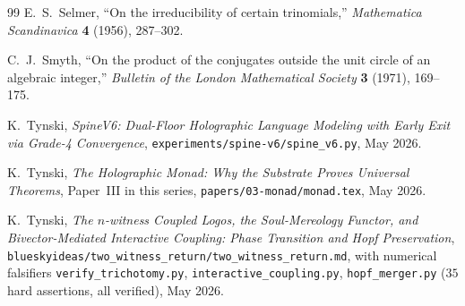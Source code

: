 \documentclass[11pt,a4paper]{article}
\theoremstyle{plain}
\theoremstyle{definition}
\theoremstyle{remark}
\numberwithin{equation}{section}
\begin{document}
\begin{thebibliography}{99}
E.~S.~Selmer,
``On the irreducibility of certain trinomials,''
\emph{Mathematica Scandinavica} \textbf{4} (1956), 287--302.

C.~J.~Smyth,
``On the product of the conjugates outside the unit circle of an
algebraic integer,''
\emph{Bulletin of the London Mathematical Society} \textbf{3}
(1971), 169--175.

K.~Tynski,
\emph{SpineV6: Dual-Floor Holographic Language Modeling with
Early Exit via Grade-4 Convergence},
\texttt{experiments/spine-v6/spine\_v6.py}, May 2026.

K.~Tynski,
\emph{The Holographic Monad: Why the Substrate Proves Universal
Theorems}, Paper~III in this series,
\texttt{papers/03-monad/monad.tex}, May 2026.

K.~Tynski,
\emph{The $n$-witness Coupled Logos, the Soul-Mereology Functor,
and Bivector-Mediated Interactive Coupling: Phase Transition and
Hopf Preservation},
\texttt{blueskyideas/two\_witness\_return/two\_witness\_return.md},
with numerical falsifiers
\texttt{verify\_trichotomy.py},
\texttt{interactive\_coupling.py},
\texttt{hopf\_merger.py}
($35$ hard assertions, all verified), May 2026.

\end{thebibliography}
\end{document}
